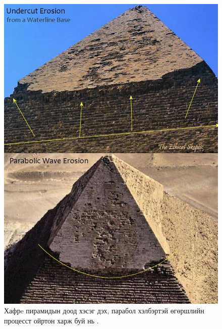 \documentclass[10pt,twocolumn,letterpaper]{article}
\begin{document}
\begin{figure}[H]
\begin{center}
   \includegraphics[width=1\linewidth]{wave.jpg}
\end{center}
   \caption{Хафрe пирамидын доод хэсэг дэх, парабол хэлбэртэй өгөршлийн процесст ойртон харж буй нь \cite{27}.}
\label{fig:19}
\label{fig:onecol}
\end{figure}
\end{document}
